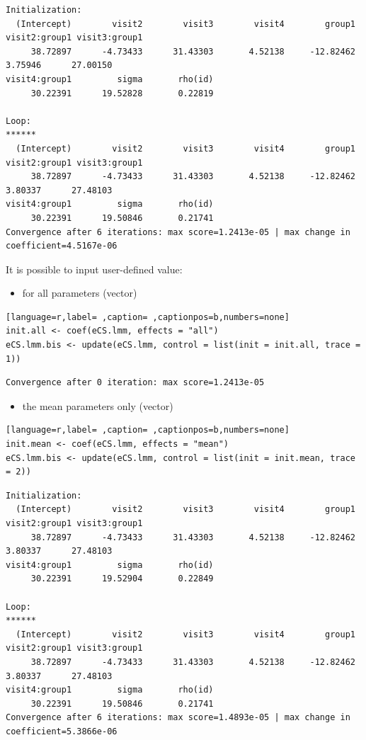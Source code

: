 \documentclass[12pt]{article}
\begin{document}
\begin{verbatim}
Initialization:
  (Intercept)        visit2        visit3        visit4        group1 visit2:group1 visit3:group1 
     38.72897      -4.73433      31.43303       4.52138     -12.82462       3.75946      27.00150 
visit4:group1         sigma       rho(id) 
     30.22391      19.52828       0.22819 

Loop:
******
  (Intercept)        visit2        visit3        visit4        group1 visit2:group1 visit3:group1 
     38.72897      -4.73433      31.43303       4.52138     -12.82462       3.80337      27.48103 
visit4:group1         sigma       rho(id) 
     30.22391      19.50846       0.21741 
Convergence after 6 iterations: max score=1.2413e-05 | max change in coefficient=4.5167e-06
\end{verbatim}

It is possible to input user-defined value:
\begin{itemize}
\item for all parameters (vector)
\end{itemize}
\begin{lstlisting}[language=r,label= ,caption= ,captionpos=b,numbers=none]
init.all <- coef(eCS.lmm, effects = "all")
eCS.lmm.bis <- update(eCS.lmm, control = list(init = init.all, trace = 1))
\end{lstlisting}

\begin{verbatim}
Convergence after 0 iteration: max score=1.2413e-05
\end{verbatim}


\begin{itemize}
\item the mean parameters only (vector)
\end{itemize}
\begin{lstlisting}[language=r,label= ,caption= ,captionpos=b,numbers=none]
init.mean <- coef(eCS.lmm, effects = "mean")
eCS.lmm.bis <- update(eCS.lmm, control = list(init = init.mean, trace = 2))
\end{lstlisting}

\begin{verbatim}
Initialization:
  (Intercept)        visit2        visit3        visit4        group1 visit2:group1 visit3:group1 
     38.72897      -4.73433      31.43303       4.52138     -12.82462       3.80337      27.48103 
visit4:group1         sigma       rho(id) 
     30.22391      19.52904       0.22849 

Loop:
******
  (Intercept)        visit2        visit3        visit4        group1 visit2:group1 visit3:group1 
     38.72897      -4.73433      31.43303       4.52138     -12.82462       3.80337      27.48103 
visit4:group1         sigma       rho(id) 
     30.22391      19.50846       0.21741 
Convergence after 6 iterations: max score=1.4893e-05 | max change in coefficient=5.3866e-06
\end{verbatim}
\end{document}
